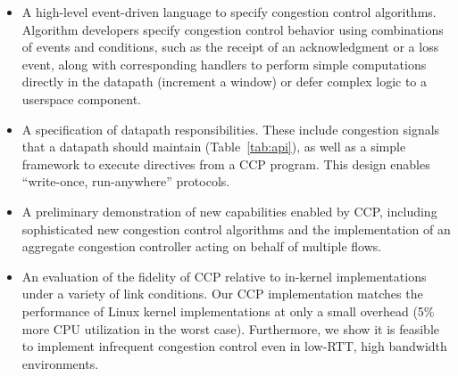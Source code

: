 \begin{itemize}
\item A high-level event-driven language to specify congestion control
  algorithms. Algorithm developers specify congestion control behavior using
  combinations of events and conditions, such as the receipt of an
  acknowledgment or a loss event, along with corresponding handlers to perform
  simple computations directly in the datapath (\eg increment a window) or defer
  complex logic to a userspace component.

\item A specification of datapath responsibilities. These include congestion
  signals that a datapath should maintain (Table~\ref{tab:api}), as
  well as a simple framework to execute directives from a CCP program. This
  design enables ``write-once, run-anywhere'' protocols.

\item A preliminary demonstration of new capabilities enabled by CCP, including
  sophisticated new congestion control algorithms and the implementation of an
  aggregate congestion controller acting on behalf of multiple flows.

\item An evaluation of the fidelity of CCP relative to in-kernel
  implementations under a variety of link conditions. Our CCP implementation
  matches the performance of Linux kernel implementations at only a small
  overhead (5\% more CPU utilization in the worst case).
  Furthermore, we show it
  is feasible to implement infrequent congestion control even in low-RTT, high
  bandwidth environments.

\end{itemize}
